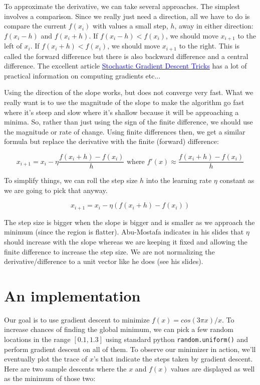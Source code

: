 \documentclass[titlepage]{tufte-book}
\begin{document}
\begin{fullwidth}
To approximate the derivative, we can take several approaches. The simplest involves a comparison. Since we really just need a direction, all we have to do is compare the current $f(x_i)$ with values a small step, $h$, away in either direction: $f(x_{i}-h)$ and $f(x_{i}+h)$.  If $f(x_{i}-h) < f(x_{i})$, we should move $x_{i+1}$ to the left of $x_{i}$. If $f(x_{i}+h) < f(x_{i})$, we should move $x_{i+1}$ to the right.  This is called the forward difference but there is also backward difference and a central difference. The excellent article \href{http://research.microsoft.com/pubs/192769/tricks-2012.pdf}{\textcolor{blue}{Stochastic Gradient Descent Tricks}} has a lot of practical information on computing gradients etc...

Using the direction of the slope works, but does not converge very fast. What we really want is to use the magnitude of the slope to make the algorithm go fast where it's steep and slow where it's shallow because it will be approaching a minima. So, rather than just using the sign of the finite difference, we should use the magnitude or rate of change. Using finite differences then, we get a similar formula but replace the derivative with the finite (forward) difference:

\[
x _{i+1} = x_i - \eta \frac{f(x_{i}+h) - f(x_{i})}{h} \text{ where } f'(x) \approx \frac{f(x_{i}+h) - f(x_{i})}{h}
\]

\noindent To simplify things, we can roll the step size $h$ into the learning rate $\eta$ constant as we are going to pick that anyway.

\[
x _{i+1} = x_i - \eta (f(x_{i}+h) - f(x_{i}))
\]

\noindent  The step size is bigger when the slope is bigger and is smaller as we approach the minimum (since the region is flatter). Abu-Mostafa indicates in his slides that $\eta$ should increase with the slope whereas we are keeping it fixed and allowing the finite difference to increase the step size. We are not normalizing the derivative/difference to a unit vector like he does (see his slides).

\section{An implementation}

Our goal is to use gradient descent to minimize $f(x) = cos(3\pi x) / x$. To increase chances of finding the global minimum, we can pick a few random locations in the range $[0.1,1.3]$ using standard python {\tt random.uniform()} and perform gradient descent on all of them. To  observe our minimizer in action, we'll eventually plot the trace of $x$'s that indicate the steps taken by gradient descent. Here are two sample descents where the $x$ and $f(x)$ values are displayed as well as the minimum of those two:


\end{fullwidth}
\end{document}
